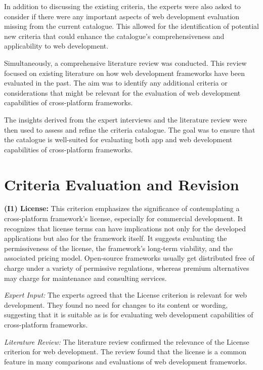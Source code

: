 In addition to discussing the existing criteria, the experts were also asked to consider if there were any important aspects of web development evaluation missing from the current catalogue. This allowed for the identification of potential new criteria that could enhance the catalogue's comprehensiveness and applicability to web development.

Simultaneously, a comprehensive literature review was conducted. This review focused on existing literature on how web development frameworks have been evaluated in the past. The aim was to identify any additional criteria or considerations that might be relevant for the evaluation of web development capabilities of cross-platform frameworks.

The insights derived from the expert interviews and the literature review were then used to assess and refine the criteria catalogue. The goal was to ensure that the catalogue is well-suited for evaluating both app and web development capabilities of cross-platform frameworks.

\section{Criteria Evaluation and Revision}
\textbf{(I1) License:}
This criterion emphasizes the significance of contemplating a cross-platform framework's license, especially for commercial development. It recognizes that license terms can have implications not only for the developed applications but also for the framework itself. It suggests evaluating the permissiveness of the license, the framework's long-term viability, and the associated pricing model. Open-source frameworks usually get distributed free of charge under a variety of permissive regulations, whereas premium alternatives may charge for maintenance and consulting services.

\emph{Expert Input:} The experts agreed that the License criterion is relevant for web development. They found no need for changes to its content or wording, suggesting that it is suitable as is for evaluating web development capabilities of cross-platform frameworks.

\emph{Literature Review:} The literature review confirmed the relevance of the License criterion for web development. The review found that the license is a common feature in many comparisons and evaluations of web development frameworks.


